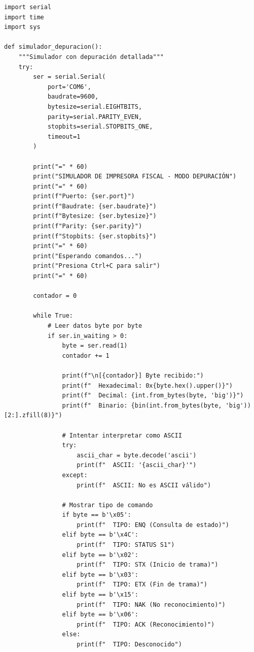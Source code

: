 \documentclass[12pt, a4paper]{article}
\begin{document}
    \begin{verbatim}
import serial
import time
import sys

def simulador_depuracion():
    """Simulador con depuración detallada"""
    try:
        ser = serial.Serial(
            port='COM6',
            baudrate=9600,
            bytesize=serial.EIGHTBITS,
            parity=serial.PARITY_EVEN,
            stopbits=serial.STOPBITS_ONE,
            timeout=1
        )
        
        print("=" * 60)
        print("SIMULADOR DE IMPRESORA FISCAL - MODO DEPURACIÓN")
        print("=" * 60)
        print(f"Puerto: {ser.port}")
        print(f"Baudrate: {ser.baudrate}")
        print(f"Bytesize: {ser.bytesize}")
        print(f"Parity: {ser.parity}")
        print(f"Stopbits: {ser.stopbits}")
        print("=" * 60)
        print("Esperando comandos...")
        print("Presiona Ctrl+C para salir")
        print("=" * 60)
        
        contador = 0
        
        while True:
            # Leer datos byte por byte
            if ser.in_waiting > 0:
                byte = ser.read(1)
                contador += 1
                
                print(f"\n[{contador}] Byte recibido:")
                print(f"  Hexadecimal: 0x{byte.hex().upper()}")
                print(f"  Decimal: {int.from_bytes(byte, 'big')}")
                print(f"  Binario: {bin(int.from_bytes(byte, 'big'))[2:].zfill(8)}")
                
                # Intentar interpretar como ASCII
                try:
                    ascii_char = byte.decode('ascii')
                    print(f"  ASCII: '{ascii_char}'")
                except:
                    print(f"  ASCII: No es ASCII válido")
                
                # Mostrar tipo de comando
                if byte == b'\x05':
                    print(f"  TIPO: ENQ (Consulta de estado)")
                elif byte == b'\x4C':
                    print(f"  TIPO: STATUS S1")
                elif byte == b'\x02':
                    print(f"  TIPO: STX (Inicio de trama)")
                elif byte == b'\x03':
                    print(f"  TIPO: ETX (Fin de trama)")
                elif byte == b'\x15':
                    print(f"  TIPO: NAK (No reconocimiento)")
                elif byte == b'\x06':
                    print(f"  TIPO: ACK (Reconocimiento)")
                else:
                    print(f"  TIPO: Desconocido")
                

\end{verbatim}
\end{document}
